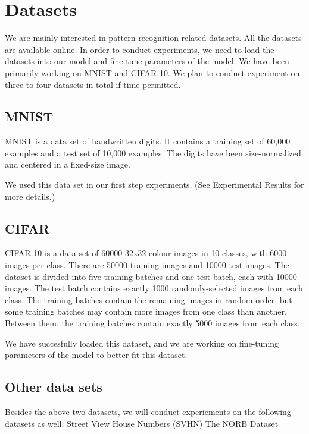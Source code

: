 \section{Datasets}
\label{sec:meth}


We are mainly interested in pattern recognition related datasets.
All the datasets are available online.
In order to conduct experiments, we need to load the datasets into our
model and fine-tune parameters of the model.
We have been primarily working on MNIST and CIFAR-10. We plan to
conduct experiment on three to four datasets in total if time permitted.

\subsection{MNIST}
MNIST is a data set of handwritten digits. It contains a training set of
60,000 examples and a test set of 10,000 examples. The digits have been
size-normalized and centered in a fixed-size image.

We used this data set in our first step experiments. (See Experimental
Results for more details.)

\subsection{CIFAR}
CIFAR-10 is a data set of 60000 32x32 colour images in 10 classes, with
6000 images per class. There are 50000 training images and 10000 test
images. The dataset is divided into five training batches and one test
batch, each with 10000 images. The test batch contains exactly 1000
randomly-selected images from each class. The training batches contain the
remaining images in random order, but some training batches may contain
more images from one class than another. Between them, the training
batches contain exactly 5000 images from each class.

We have succesfully loaded this dataset, and we are working on
fine-tuning parameters of the model to better fit this dataset.

\subsection{Other data sets}
Besides the above two datasets, we will conduct experiements on the
following datasets as well:
 Street View House Numbers (SVHN)
 The NORB Dataset

